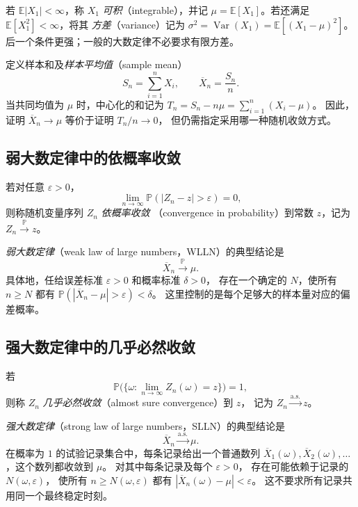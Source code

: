 \documentclass[UTF8,12pt,a4paper,fontset=fandol]{ctexart}
\begin{document}
若 $\mathbb E|X_1|<\infty$，称 $X_1$ \emph{可积}（integrable），并记
$\mu=\mathbb E[X_1]$。若还满足 $\mathbb E[X_1^2]<\infty$，将其
\emph{方差}（variance）记为
$\sigma^2=\operatorname{Var}(X_1)=\mathbb E[(X_1-\mu)^2]$。
后一个条件更强；一般的大数定律不必要求有限方差。

定义样本和及\emph{样本平均值}（sample mean）
\begin{equation}
  S_n=\sum_{i=1}^nX_i,\qquad
  \overline X_n=\frac{S_n}{n}.
  \label{eq:lln-sample-mean}
\end{equation}
当共同均值为 $\mu$ 时，中心化的和记为
$T_n=S_n-n\mu=\sum_{i=1}^n(X_i-\mu)$。
因此，证明 $\overline X_n\to\mu$ 等价于证明 $T_n/n\to0$，
但仍需指定采用哪一种随机收敛方式。

\subsection{弱大数定律中的依概率收敛}

\begin{definition}[依概率收敛]
\label{def:lln-probability-convergence}
若对任意 $\varepsilon>0$，
\[
  \lim_{n\to\infty}\mathbb P(|Z_n-z|>\varepsilon)=0,
\]
则称随机变量序列 $Z_n$ \emph{依概率收敛}
（convergence in probability）到常数 $z$，记为 $Z_n\xrightarrow{\mathbb P}z$。
\end{definition}

\emph{弱大数定律}（weak law of large numbers，WLLN）的典型结论是
\begin{equation}
  \overline X_n\xrightarrow{\mathbb P}\mu.
  \label{eq:lln-wlln-statement}
\end{equation}
具体地，任给误差标准 $\varepsilon>0$ 和概率标准 $\delta>0$，
存在一个确定的 $N$，使所有 $n\geq N$ 都有
$\mathbb P(|\overline X_n-\mu|>\varepsilon)<\delta$。
这里控制的是每个足够大的样本量对应的偏差概率。

\subsection{强大数定律中的几乎必然收敛}

\begin{definition}[几乎必然收敛]
\label{def:lln-almost-sure-convergence}
若
\[
  \mathbb P\bigl(\{\omega:\lim_{n\to\infty}Z_n(\omega)=z\}\bigr)=1,
\]
则称 $Z_n$ \emph{几乎必然收敛}（almost sure convergence）到 $z$，
记为 $Z_n\xrightarrow{\mathrm{a.s.}}z$。
\end{definition}

\emph{强大数定律}（strong law of large numbers，SLLN）的典型结论是
\begin{equation}
  \overline X_n\xrightarrow{\mathrm{a.s.}}\mu.
  \label{eq:lln-slln-statement}
\end{equation}
在概率为 $1$ 的试验记录集合中，每条记录给出一个普通数列
$\overline X_1(\omega),\overline X_2(\omega),\ldots$，这个数列都收敛到 $\mu$。
对其中每条记录及每个 $\varepsilon>0$，
存在可能依赖于记录的 $N(\omega,\varepsilon)$，
使所有 $n\geq N(\omega,\varepsilon)$ 都有
$|\overline X_n(\omega)-\mu|<\varepsilon$。
这不要求所有记录共用同一个最终稳定时刻。
\end{document}
